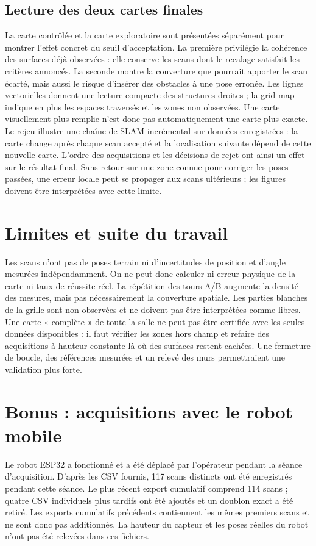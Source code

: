 \documentclass[11pt,a4paper]{article}
\begin{document}
\subsection{Lecture des deux cartes finales}
La carte contrôlée et la carte exploratoire sont présentées séparément pour
montrer l'effet concret du seuil d'acceptation. La première privilégie la
cohérence des surfaces déjà observées : elle conserve les scans dont le
recalage satisfait les critères annoncés. La seconde montre la couverture
que pourrait apporter le scan écarté, mais aussi le risque d'insérer des
obstacles à une pose erronée. Les lignes vectorielles donnent une lecture
compacte des structures droites ; la grid map indique en plus les espaces
traversés et les zones non observées. Une carte visuellement plus remplie
n'est donc pas automatiquement une carte plus exacte.
Le rejeu illustre une chaîne de SLAM incrémental sur données enregistrées :
la carte change après chaque scan accepté et la localisation suivante dépend
de cette nouvelle carte. L'ordre des acquisitions et les décisions de rejet
ont ainsi un effet sur le résultat final. Sans retour sur une zone connue
pour corriger les poses passées, une erreur locale peut se propager aux scans
ultérieurs ; les figures doivent être interprétées avec cette limite.

\section{Limites et suite du travail}
Les scans n'ont pas de poses terrain ni d'incertitudes de position et d'angle
mesurées indépendamment. On ne peut donc calculer ni erreur physique de la
carte ni taux de réussite réel. La répétition des tours A/B augmente la
densité des mesures, mais pas nécessairement la couverture spatiale. Les
parties blanches de la grille sont non observées et ne doivent pas être
interprétées comme libres. Une carte « complète » de toute la salle ne peut
pas être certifiée avec les seules données disponibles : il faut vérifier les
zones hors champ et refaire des acquisitions à hauteur constante là où des
surfaces restent cachées. Une fermeture de boucle, des références mesurées et
un relevé des murs permettraient une validation plus forte.


\section{Bonus : acquisitions avec le robot mobile}
Le robot ESP32 a fonctionné et a été déplacé par l'opérateur pendant la séance
d'acquisition. D'après les CSV fournis, 117 scans distincts ont été
enregistrés pendant cette séance. Le plus récent export cumulatif
comprend 114 scans ; quatre CSV individuels plus tardifs ont été ajoutés et un
doublon exact a été retiré. Les exports cumulatifs précédents contiennent les
mêmes premiers scans et ne sont donc pas additionnés. La hauteur du capteur et
les poses réelles du robot n'ont pas été relevées dans ces fichiers.
\end{document}
